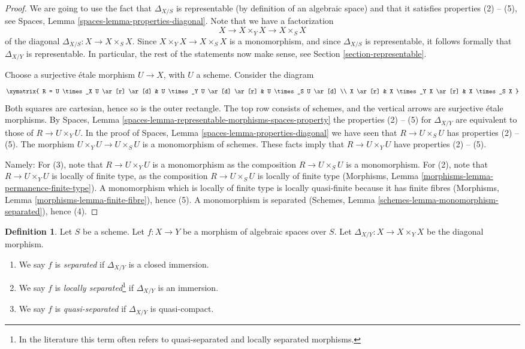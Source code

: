 \documentclass{stacks-project}
\theoremstyle{plain}
\theoremstyle{definition}
\newtheorem{definition}[subsection]{Definition}
\theoremstyle{remark}
\numberwithin{equation}{subsection}
\begin{document}
\begin{proof}
We are going to use the fact that $\Delta_{X/S}$ is
representable (by definition of an algebraic space) and that
it satisfies properties (2) -- (5), see
Spaces, Lemma \ref{spaces-lemma-properties-diagonal}.
Note that we have a factorization
$$
X
\longrightarrow
X \times_Y X
\longrightarrow
X \times_S X
$$
of the diagonal $\Delta_{X/S} : X \to X \times_S X$. Since
$X \times_Y X \to X \times_S X$ is a monomorphism, and since
$\Delta_{X/S}$ is representable, it follows formally that
$\Delta_{X/Y}$ is representable. In particular, the rest of
the statements now make sense, see
Section \ref{section-representable}.

\medskip\noindent
Choose a surjective \'etale morphism $U \to X$, with $U$ a scheme.
Consider the diagram
$$
\xymatrix{
R = U \times_X U \ar[r] \ar[d] &
U \times_Y U \ar[d] \ar[r] &
U \times_S U \ar[d] \\
X \ar[r] & X \times_Y X \ar[r] & X \times_S X
}
$$
Both squares are cartesian, hence so is the outer rectangle.
The top row consists of schemes, and the vertical arrows
are surjective \'etale morphisms. By
Spaces, Lemma \ref{spaces-lemma-representable-morphisms-spaces-property}
the properties (2) -- (5) for $\Delta_{X/Y}$ are equivalent to those of
$R \to U \times_Y U$. In the proof of
Spaces, Lemma \ref{spaces-lemma-properties-diagonal}
we have seen that $R \to U \times_S U$ has properties (2) -- (5).
The morphism $U \times_Y U \to U \times_S U$ is a monomorphism
of schemes. These facts imply that $R \to U \times_Y U$ have
properties (2) -- (5).

\medskip\noindent
Namely: For (3), note that $R \to U \times_Y U$
is a monomorphism as the composition
$R \to U \times_S U$ is a monomorphism. For (2), note that
$R \to U \times_Y U$ is locally of finite type, as the
composition $R \to U \times_S U$ is locally of finite type
(Morphisms, Lemma \ref{morphisms-lemma-permanence-finite-type}).
A monomorphism which is locally of finite type is locally quasi-finite
because it has finite fibres
(Morphisms, Lemma \ref{morphisms-lemma-finite-fibre}), hence (5).
A monomorphism is separated
(Schemes, Lemma \ref{schemes-lemma-monomorphism-separated}), hence (4).
\end{proof}

\begin{definition}
\label{definition-separated}
Let $S$ be a scheme.
Let $f : X \to Y$ be a morphism of algebraic spaces over $S$.
Let $\Delta_{X/Y} : X \to X \times_Y X$ be the diagonal morphism.
\begin{enumerate}
\item We say $f$ is {\it separated} if $\Delta_{X/Y}$ is a closed immersion.
\item We say $f$ is {\it locally separated}\footnote{In the literature
this term often refers to quasi-separated and locally separated morphisms.}
if $\Delta_{X/Y}$ is an immersion.
\item We say $f$ is {\it quasi-separated} if $\Delta_{X/Y}$ is quasi-compact.
\end{enumerate}
\end{definition}
\end{document}
